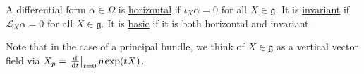 \begin{defn}
	A differential form $\alpha\in\Omega$ is 
	\underline{horizontal} if $\iota_X\alpha=0$ for all $X\in\mathfrak{g}$. 
	It is \underline{invariant} if $\mathcal{L}_X\alpha = 0$ for all $X\in
	\mathfrak{g}$. It is \underline{basic} if it is both horizontal and
	invariant.
\end{defn}
Note that in the case of a principal bundle, we think of $X\in \mathfrak{g}$ as 
a vertical vector field via $X_p = \odv{}{t}_{t=0} p \exp (t X)$. 
\begin{comment} %
\begin{defn}
	A differential form $\alpha\in\Omega(P,V)$ on a principal $G$-bundle  with 
	representation $(V,\rho)$ is \underline{$\rho$-equivariant}   
	if for every $g\in G$, $r_g^*\alpha = \rho(g^{-1})\alpha$. 
	\\
	A differential form $\alpha\in\Omega(P,V)$ on a principal $G$-bundle  with 
	representation $(V,\rho)$ is \underline{basic}  
	if it is horizontal and $\rho$-equivariant. This subspace is
	denoted $\Omega_{bas}(P,V)$.
\end{defn}
Let $P$ be a principle $G$-bundle, and let ($V,\rho$) be a representation of
$G$. Let $E= P\times_\rho V$ be the associated bundle.
\begin{thm} %
	The map $\Omega_{bas}^k(P,V) \to \Omega^k(M,P\times_\rho V)$ given by 
	$\omega \mapsto \alpha_x = f_p \circ \omega_p$
	is a linear isomorphism, where $f_p: V\to E_x$ is the isomorphism  $v\mapsto
	[p,v]$, and $p\in\pi^{-1}(x)$ is any point.
\end{thm}

\begin{cor} %
	There is a natural isomorphism between $\Gamma(M,P\times_\rho V)$ and
	$\rho$-equivariant maps in
	$C^{\infty}(P,V)$, given by sending $s\in C^{\infty}(P,V)^G$ to $s_M$
	defined by  $s_M(x) = [p,s(p)]$, where  $p\in\pi^{-1}(x)$ is any element.
\end{cor}


Recall that a \underline{vertical vector} on a fibre bundle $E$ with base  $M$
is a tangent vector  $X\in TE$ such that  $X(\pi^* f) = 0$ for any  $f\in
C^\infty(M)$. The space $V_pP$ of vertical tangent vectors to a point $p$ in a
principal $G$-bundle can be canonically identified with the Lie algebra $\mathfrak{g}$ 
of $G$ in the following way. 
If $X\in\mathfrak{g}$, the \underline{fundamental vector field} associated to
$X$, denoted $X_P \in \Gamma(VP)$, is
 \[
X_P = \odv{}{t}_{t=0} p \exp (t X)
\] 
This is a vertical vector field because $X_P(\pi^*f) = \odv{}{t}_{t=0} f(p \exp
(t X)) = 0$. 
\end{comment}



